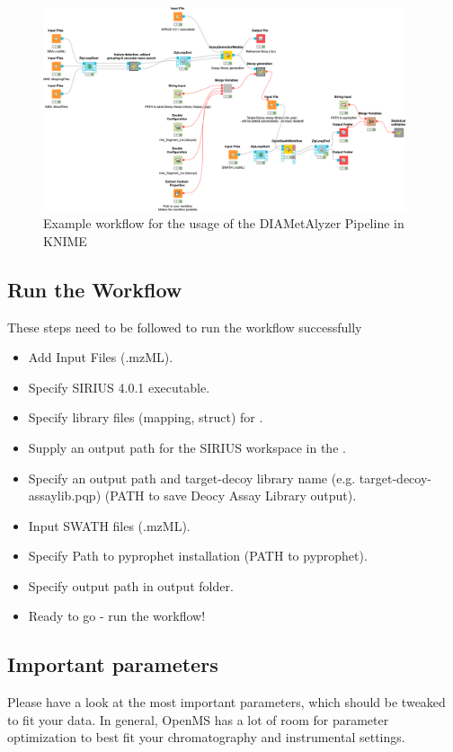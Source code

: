 \begin{figure}[!h]
  \centering
  \includegraphics[width=0.95\textwidth]{graphics/openswathmetabo/oswm_example_wf.png}
  \caption{Example workflow for the usage of the DIAMetAlyzer Pipeline in KNIME}
  \label{fig:oswm_example_wf}
\end{figure}

\subsection{Run the Workflow}
These steps need to be followed to run the workflow successfully

\begin{itemize}
\item Add Input Files (.mzML).
\item Specify SIRIUS 4.0.1 executable.
\item Specify library files (mapping, struct) for .
\item Supply an output path for the SIRIUS workspace in the .
\item Specify an output path and target-decoy library name (e.g. target-decoy-assaylib.pqp) (PATH to save Deocy Assay Library output).
\item Input SWATH files (.mzML).
\item Specify Path to pyprophet installation (PATH to pyprophet).
\item Specify output path in output folder.
\item Ready to go - run the workflow! 
\end{itemize}

\subsection{Important parameters}
\noindent Please have a look at the most important parameters, which should be tweaked to fit your data. In general, OpenMS has a lot of room for parameter optimization to best fit your chromatography and instrumental settings. \\

